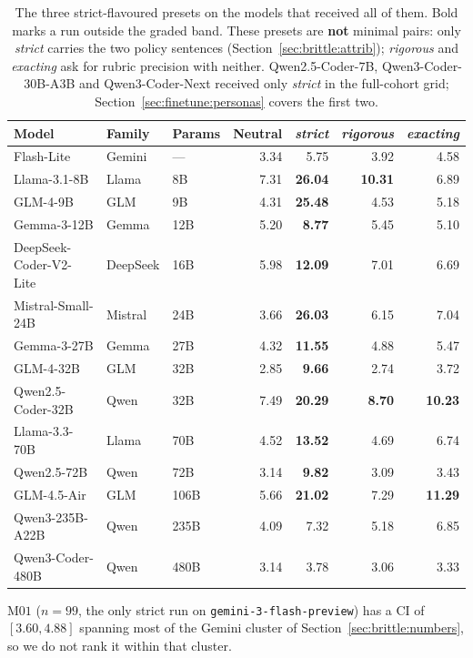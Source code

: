 \begin{table}[t]
\centering
\caption{The three strict-flavoured presets on the models that received all of them. Bold marks a run outside the graded band. These presets are \textbf{not} minimal pairs: only \emph{strict} carries the two policy sentences (Section~\ref{sec:brittle:attrib}); \emph{rigorous} and \emph{exacting} ask for rubric precision with neither. Qwen2.5-Coder-$7$B, Qwen3-Coder-$30$B-A$3$B and Qwen3-Coder-Next received only \emph{strict} in the full-cohort grid; Section~\ref{sec:finetune:personas} covers the first two.}
\label{tab:wording}
\small
\begin{tabular}{lllrrrr}
\toprule
Model & Family & Params & Neutral & \emph{strict} & \emph{rigorous} & \emph{exacting} \\
\midrule
Flash-Lite & Gemini & --- & 3.34 & 5.75 & 3.92 & 4.58 \\
\midrule
Llama-3.1-8B & Llama & 8B & 7.31 & \textbf{26.04} & \textbf{10.31} & 6.89 \\
GLM-4-9B & GLM & 9B & 4.31 & \textbf{25.48} & 4.53 & 5.18 \\
Gemma-3-12B & Gemma & 12B & 5.20 & \textbf{8.77} & 5.45 & 5.10 \\
DeepSeek-Coder-V2-Lite & DeepSeek & 16B & 5.98 & \textbf{12.09} & 7.01 & 6.69 \\
Mistral-Small-24B & Mistral & 24B & 3.66 & \textbf{26.03} & 6.15 & 7.04 \\
Gemma-3-27B & Gemma & 27B & 4.32 & \textbf{11.55} & 4.88 & 5.47 \\
GLM-4-32B & GLM & 32B & 2.85 & \textbf{9.66} & 2.74 & 3.72 \\
Qwen2.5-Coder-32B & Qwen & 32B & 7.49 & \textbf{20.29} & \textbf{8.70} & \textbf{10.23} \\
Llama-3.3-70B & Llama & 70B & 4.52 & \textbf{13.52} & 4.69 & 6.74 \\
Qwen2.5-72B & Qwen & 72B & 3.14 & \textbf{9.82} & 3.09 & 3.43 \\
GLM-4.5-Air & GLM & 106B & 5.66 & \textbf{21.02} & 7.29 & \textbf{11.29} \\
Qwen3-235B-A22B & Qwen & 235B & 4.09 & 7.32 & 5.18 & 6.85 \\
Qwen3-Coder-480B & Qwen & 480B & 3.14 & 3.78 & 3.06 & 3.33 \\
\bottomrule
\end{tabular}
\end{table}

M$01$ ($n = 99$, the only strict run on \texttt{gemini-3-flash-preview}) has a CI of $[3.60, 4.88]$ spanning most of the Gemini cluster of Section~\ref{sec:brittle:numbers}, so we do not rank it within that cluster.

